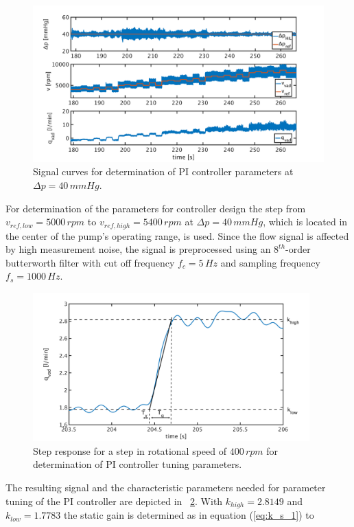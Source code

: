 \begin{figure}[ht]
  \centering
  \includegraphics[width=\textwidth]{images/chapt_5/dyn_meas_40.pdf}
  \caption[Signal curves for determination of PI controller parameters at $\Delta{p}=40\,mmHg$]{Signal curves for determination of PI controller parameters at $\Delta{p}=40\,mmHg$.}
  \label{fig:dyn_meas_40}
\end{figure}
For determination of the parameters for controller design the step from $v_{ref,low}=5000\, rpm$ to $v_{ref,high}=5400\, rpm$ at $\Delta{p}=40\,mmHg$, which is located in the center of the pump's operating range, is used.
Since the flow signal is affected by high measurement noise, the signal is preprocessed using an $8^{th}$-order butterworth filter with cut off frequency $f_c=5\,Hz$ and sampling frequency $f_s=1000\,Hz$.
\begin{figure}[ht]
  \centering
  \includegraphics[width=0.95\textwidth]{images/chapt_5/param_calc_PI.pdf}
  \caption[Step response for determination of PI controller tuning parameters]{Step response for a step in rotational speed of $400\,rpm$ for determination of PI controller tuning parameters.}
  \label{fig:param_calc_PI}
\end{figure}
The resulting signal and the characteristic parameters needed for parameter tuning of the PI controller are depicted in \figurename~\ref{fig:param_calc_PI}. With $k_{high}=2.8149$ and $k_{low}=1.7783$ the static gain is determined as in equation (\ref{eq:k_s_1}) to
